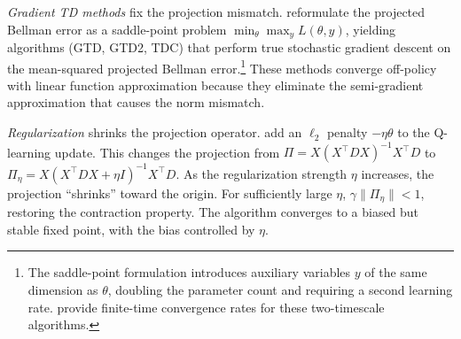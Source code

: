 \emph{Gradient TD methods} fix the projection mismatch. \citet{sutton2009gtd} reformulate the projected Bellman error as a saddle-point problem $\min_\theta \max_y L(\theta, y)$, yielding algorithms (GTD, GTD2, TDC) that perform true stochastic gradient descent on the mean-squared projected Bellman error.\footnote{The saddle-point formulation introduces auxiliary variables $y$ of the same dimension as $\theta$, doubling the parameter count and requiring a second learning rate. \citet{bhandari2021finite} provide finite-time convergence rates for these two-timescale algorithms.} These methods converge off-policy with linear function approximation because they eliminate the semi-gradient approximation that causes the norm mismatch.

\emph{Regularization} shrinks the projection operator. \citet{lim2024regularized} add an $\ell_2$ penalty $-\eta\theta$ to the Q-learning update. This changes the projection from $\Pi = X(X^\top D X)^{-1} X^\top D$ to $\Pi_\eta = X(X^\top D X + \eta I)^{-1} X^\top D$. As the regularization strength $\eta$ increases, the projection ``shrinks'' toward the origin. For sufficiently large $\eta$, $\gamma\|\Pi_\eta\| < 1$, restoring the contraction property. The algorithm converges to a biased but stable fixed point, with the bias controlled by $\eta$.




